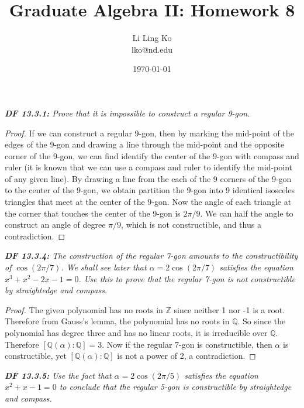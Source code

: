 \documentclass{article}
\begin{document}
\title{Graduate Algebra II: Homework 8}
\author{Li Ling Ko\\ lko@nd.edu}
\date{\today}
\maketitle

\it \textbf{DF 13.3.1:} Prove that it is impossible to construct a regular
  9-gon.

  \begin{proof}
    If we can construct a regular 9-gon, then by marking the mid-point of
    the edges of the 9-gon and drawing a line through the mid-point and the
    opposite corner of the 9-gon, we can find identify the center of the
    9-gon with compass and ruler (it is known that we can use a compass and
    ruler to identify the mid-point of any given line). By drawing a line
    from the each of the 9 corners of the 9-gon to the center of the
    9-gon, we obtain partition the 9-gon into 9 identical isosceles
    triangles that meet at the center of the 9-gon. Now the angle of each
    triangle at the corner that touches the center of the 9-gon is
    $2\pi/9$. We can half the angle to construct an angle of degree
    $\pi/9$, which is not constructible, and thus a contradiction.
  \end{proof}

\it \textbf{DF 13.3.4:} The construction of the regular 7-gon amounts to
  the constructibility of $\cos(2\pi/7)$. We shall see later that
  $\alpha=2\cos(2\pi/7)$ satisfies the equation $x^3+x^2-2x-1=0$. Use this
  to prove that the regular 7-gon is not constructible by straightedge and
  compass.

  \begin{proof}
    The given polynomial has no roots in $\mathbb{Z}$ since neither 1 nor
    -1 is a root. Therefore from Gauss's lemma, the polynomial has no roots
    in $\mathbb{Q}$. So since the polynomial has degree three and has no
    linear roots, it is irreducible over $\mathbb{Q}$. Therefore
    $[\mathbb{Q}(\alpha):\mathbb{Q}]=3$. Now if the regular 7-gon is
    constructible, then $\alpha$ is constructible, yet
    $[\mathbb{Q}(\alpha):\mathbb{Q}]$ is not a power of 2, a contradiction.
  \end{proof}

\it \textbf{DF 13.3.5:} Use the fact that $\alpha=2\cos(2\pi/5)$ satisfies
  the equation $x^2+x-1=0$ to conclude that the regular 5-gon is
  constructible by straightedge and compass.
\end{document}
